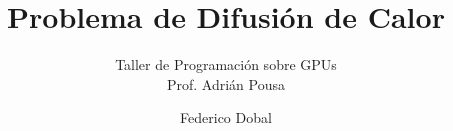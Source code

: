 \documentclass[12pt]{extarticle}
\title{Problema de Difusión de Calor}
\subtitle{Taller de Programación sobre GPUs\\Prof. Adrián Pousa}
\author{Federico Dobal}
\begin{document}
\portada

\tableofcontents
\clearpage









\end{document}
